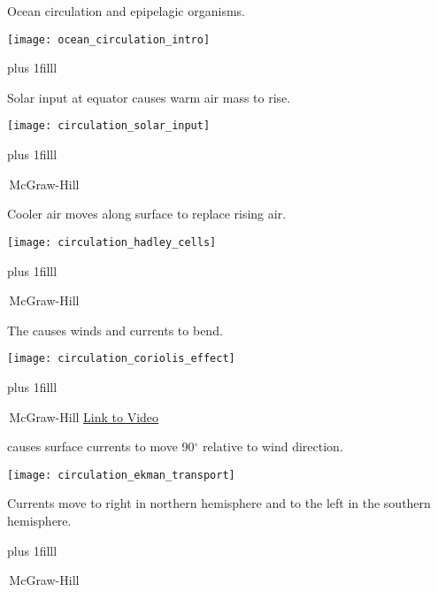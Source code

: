 \documentclass[t]{beamer}
\begin{document}
\begin{frame}[t]{Ocean circulation and epipelagic organisms.}
	\begin{center}
	\texttt{[image: ocean\_circulation\_intro]}
	\end{center}

\vskip0pt plus 1filll

\end{frame}

\begin{frame}[t]{Solar input at equator causes warm air mass to rise.}
	\begin{center}
	\texttt{[image: circulation\_solar\_input]}
	\end{center}

\vskip0pt plus 1filll

\tiny \textcopyright\,McGraw-Hill
\end{frame}

\begin{frame}[t]{Cooler air moves along surface to replace rising air.}
	\begin{center}
	\texttt{[image: circulation\_hadley\_cells]}
	\end{center}

\vskip0pt plus 1filll

\tiny \textcopyright\,McGraw-Hill
\end{frame}


\begin{frame}[t]{The  causes winds and currents to bend.}
	\begin{center}
	\texttt{[image: circulation\_coriolis\_effect]}
	\end{center}

\vskip0pt plus 1filll

\tiny \textcopyright\,McGraw-Hill \hfill \href{https://youtu.be/aeY9tY9vKgs}{Link to Video}%
\end{frame}

\begin{frame}[t]{ causes surface currents to move 90$^\circ$ relative to wind direction.}
	\begin{multicols}{2}

		\texttt{[image: circulation\_ekman\_transport]}

	\columnbreak

		\hangpara\parbox[t]{0.45\textwidth}{Currents move to right in northern hemisphere and to the left in the southern hemisphere.}
	
	
	
	\end{multicols}

	\vskip0pt plus 1filll

	\tiny \textcopyright\,McGraw-Hill

\end{frame}
\end{document}

